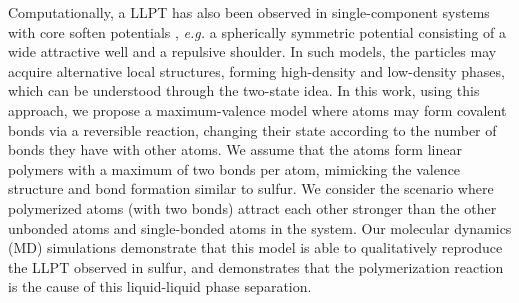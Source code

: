 \documentclass[9pt,twocolumn,twoside,lineno]{pnas-new}
\begin{document}
%

Computationally, a LLPT has also been observed in single-component systems with core soften potentials \cite{Stell1972,Stillinger1993,Jagla2001,Franzese2001,Gibson2006,Skibinsky2004}, \emph{e.g.} a spherically symmetric potential consisting of a wide attractive well and a repulsive shoulder. In such models, the particles may acquire alternative local structures, forming high-density and low-density phases, which can be understood through the two-state idea. In this work, using this approach, we propose a maximum-valence model \cite{Zaccarelli2005,Debenedetti,Debenedetti2} where atoms may form covalent bonds via a reversible reaction, changing their state according to the number of bonds they have with other atoms. We assume that the atoms form linear polymers with a maximum of two bonds per atom, mimicking the valence structure and bond formation similar to sulfur. We consider the scenario where polymerized atoms (with two bonds) attract each other stronger than the other unbonded atoms and single-bonded atoms in the system. Our molecular dynamics (MD) simulations demonstrate that this model is able to qualitatively reproduce the LLPT observed in sulfur, and demonstrates that the polymerization reaction is the cause of this liquid-liquid phase separation.
\end{document}
